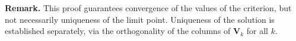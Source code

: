 \documentclass[11pt]{article}
\newtheorem{lemma}{Lemma}
\DeclareMathOperator{\trace}{\mathrm{trace}}
\newcommand{\X}{\textbf{X}}
\newcommand{\V}{\textbf{V}}
\begin{document}






\medskip
\noindent
\textbf{Remark.} This proof guarantees convergence of the values of the criterion, but not necessarily uniqueness of the limit point. Uniqueness of the solution is established separately, via the orthogonality of the columns of $\V_k$ for all $k$.
\end{document}
